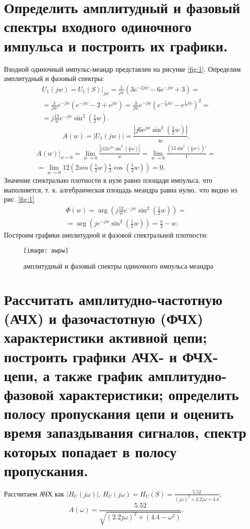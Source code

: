 \documentclass[a4paper,14pt ]{article} %
\begin{document}
    \section{Определить амплитудный и фазовый спектры входного одиночного импульса и построить их графики.}
    Входной одиночный импульс-меандр представлен на рисунке \ref{fig:1}.
    Определим амплитудный и фазовый спектры:
    \begin{multline}
        U_1(jw) = U_1(S)|_{jw} = \frac{1}{jw}\left(3e^{-2jw} - 6e^{-jw} + 3\right) = \\ 
         = \frac{3}{jw}e^{-jw}(e^{-jw} - 2 + e^{jw}) = 
         \frac{3}{jw}e^{-jw}\left(e^{-\frac{1}{2}jw} - e^{\frac12jw}\right)^2 = \\
         = j\frac{12}{w}e^{-jw}\sin^2\left(\frac12w\right).
    \end{multline} 
    \begin{equation}
        A(w) = \left| U_1(jw)\right| = 
        \frac{|j6e^{jw}\sin^2\left(\frac12w\right)
        |}{w}. 
    \end{equation}
    \begin{multline*}
        A(w)|_{w=0}=\lim\limits_{w \to 0}
        \frac{|j12e^{jw}\sin^2\left(\frac12w\right)
        |}{w} = \lim\limits_{w \to 0}
        \frac{\left(12\sin^2\left(\frac12w\right)\right)'
        }{1} = \\
        = \lim\limits_{w \to 0}12\left(2sin\left(\frac12w\right)
        \frac12\cos\left(\frac12w\right)\right) = 0.
    \end{multline*}
    \indent Значение спектрально плотности в нуле равно площади импульса, 
    что выполняется, т. к. алгебраическая площадь меандра равна нулю,\
    что видно из рис. \ref{fig:1}
    \begin{multline}
        \Phi(w) = \arg\left(
            j\frac{12}{w}e^{-jw}\sin^2\left(\frac12w\right)
            \right) = \\ = \arg\left(je^{-jw}\sin^2\left(\frac12w\right)\right) = 
            \frac{\pi}2 - w.
    \end{multline}
    \indent Построим графики амплитудной и фазовой спектральной плотности:
    \begin{figure}[H]
        \texttt{[image: awpw]}
        \centering
        \caption{амплитудный и фазовый спектры одиночного импульса-меандра}
        \label{fig:6}
    \end{figure}
    \newpage
    \section{Рассчитать амплитудно-частотную (АЧХ) и фазочастотную (ФЧХ) характеристики активной цепи; построить графики АЧХ- и ФЧХ-цепи, а также график амплитудно-фазовой характеристики; определить полосу пропускания цепи и оценить время запаздывания сигналов, спектр которых попадает в полосу пропускания.}
    Рассчитаем АЧХ как $|H_U(j\omega)|$, $H_U(j\omega) =  
    H_U(S) = \frac{5.52}{(j\omega)^2 + 2.2j\omega+ 4.4}$;
    \begin{equation}
        A(\omega) = \frac{5.52}{\sqrt{(2.2j\omega)^2 + (4.4 - \omega^2)}}.
    \end{equation}
\end{document}
